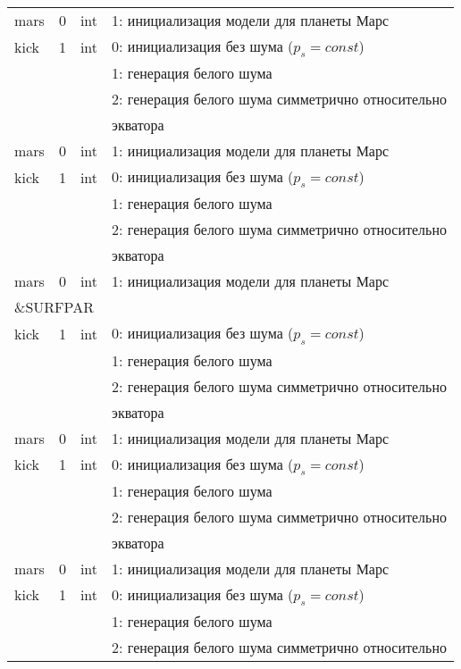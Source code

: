 \begin{longtable}[c]{|l|c|l|l|}
     mars & 0 & int & 1: инициализация модели для планеты Марс     \\
    kick & 1 & int & 0: инициализация без шума (\(p_s = const\)) \\
          &   &     & 1: генерация белого шума                  \\
          &   &     & 2: генерация белого шума симметрично относительно \\
      & & & экватора    \\
     mars & 0 & int & 1: инициализация модели для планеты Марс     \\
    kick & 1 & int & 0: инициализация без шума (\(p_s = const\)) \\
          &   &     & 1: генерация белого шума                  \\
          &   &     & 2: генерация белого шума симметрично относительно \\
      & & & экватора    \\
     mars & 0 & int & 1: инициализация модели для планеты Марс     \\
     \hline
     \multicolumn{4}{|l|}{\&SURFPAR}        \\ \hline
    kick & 1 & int & 0: инициализация без шума (\(p_s = const\)) \\
          &   &     & 1: генерация белого шума                  \\
          &   &     & 2: генерация белого шума симметрично относительно \\
      & & & экватора    \\
     mars & 0 & int & 1: инициализация модели для планеты Марс     \\
    kick & 1 & int & 0: инициализация без шума (\(p_s = const\)) \\
          &   &     & 1: генерация белого шума                  \\
          &   &     & 2: генерация белого шума симметрично относительно \\
      & & & экватора    \\
     mars & 0 & int & 1: инициализация модели для планеты Марс     \\
    kick & 1 & int & 0: инициализация без шума (\(p_s = const\)) \\
          &   &     & 1: генерация белого шума                  \\
          &   &     & 2: генерация белого шума симметрично относительно \\

\end{longtable}
